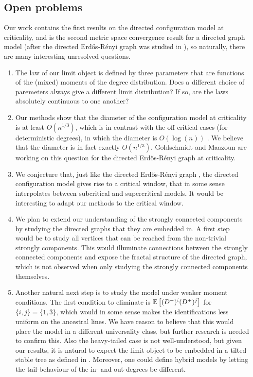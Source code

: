 \subsection{Open problems}
Our work contains the first results on the directed configuration model at criticality, and is the second metric space convergence result for a directed graph model (after the directed Erd\H{o}s-Rényi graph was studied in \cite{goldschmidtScalingLimitCritical2019}), so naturally, there are many interesting unresolved questions.
\begin{enumerate}
    \item The law of our limit object is defined by three parameters that are functions of the (mixed) moments of the degree distribution. Does a different choice of paremeters always give a different limit distribution? If so, are the laws absolutely continuous to one another?
    \item Our methods show that the diameter of the configuration model at criticality is at least $O(n^{1/3})$, which is in contrast with the off-critical cases (for deterministic degrees), in which the diameter is $O(\log(n))$ \cite{caiDiameterDirectedConfiguration2020}. We believe that the diameter is in fact exactly $O(n^{1/3})$. Goldschmidt and Maazoun are working on this question for the directed Erd\H{o}s-Rényi graph at criticality. 
     \item We conjecture that, just like the directed Erd\H{o}s-Rényi graph \cite{goldschmidtScalingLimitCritical2019}, the directed configuration model gives rise to a critical window, that in some sense interpolates between subcritical and supercritical models. It would be interesting to adapt our methods to the critical window.
     \item We plan to extend our understanding of the strongly connected components by studying the directed graphs that they are embedded in. A first step would be to study all vertices that can be reached from the non-trivial strongly components. This would illuminate connections between the strongly connected components and expose the fractal structure of the directed graph, which is not observed when only studying the strongly connected components themselves.
    \item Another natural next step is to study the model under weaker moment conditions. The first condition to eliminate is ${\mathbb E}\left[(D^-)^i(D^+)^j\right]$ for $\{i,j\}=\{1,3\}$, which would in some sense makes the identifications less uniform on the ancestral lines. We have reason to believe that this would place the model in  a different universality class, but further research is needed to confirm this. Also the heavy-tailed case is not well-understood, but given our results, it is natural to expect the limit object to be embedded in a tilted stable tree as defined in \cite{conchon--kerjanStableGraphMetric2020}. Moreover, one could define hybrid models by letting the tail-behaviour of the in- and out-degrees be different. 

\end{enumerate}
